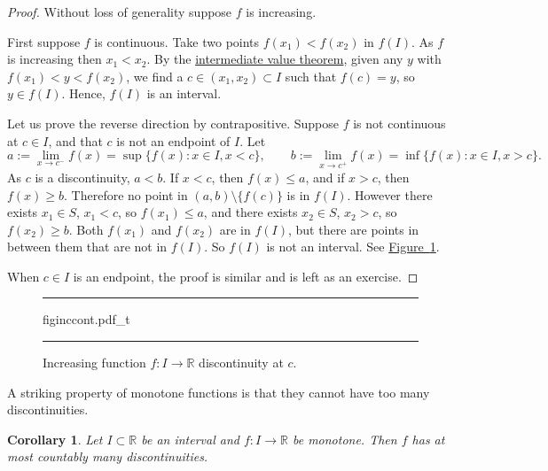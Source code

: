 \documentclass[12pt]{book}
\newenvironment{myfigureht}{%
\begin{figure}[h!t]
\noindent\rule{\textwidth}{0.4pt}\vspace{12pt}\par\centering}%
{\par\noindent\rule{\textwidth}{0.4pt}
\end{figure}}
\newcommand{\R}{{\mathbb{R}}}
\theoremstyle{plain}
\newtheorem{cor}[thm]{Corollary}
\theoremstyle{remark}
\theoremstyle{definition}
\theoremstyle{exercise}
\theoremstyle{example}
\newcommand{\figureref}[1]{\hyperref[#1]{Figure~\ref*{#1}}}
\newcommand{\corref}[1]{\hyperref[#1]{Corollary~\ref*{#1}}}
\begin{document}
\begin{proof}
Without loss of generality suppose $f$ is increasing.

First suppose $f$ is continuous.  Take two points
$f(x_1) < f(x_2)$ in $f(I)$.
As $f$ is increasing then $x_1 < x_2$.  By the
\hyperref[IVT:thm]{intermediate value theorem},
given any $y$ with $f(x_1) < y < f(x_2)$, we find
a $c \in (x_1,x_2) \subset I$ such that $f(c) = y$, so $y \in f(I)$. 
Hence, $f(I)$ is an interval.


Let us prove the reverse direction by contrapositive.
Suppose $f$ is not continuous at $c \in I$,
and that $c$ is not an endpoint of $I$.
Let
\begin{equation*}
a := \lim_{x \to c^-} f(x) = \sup \{ f(x) : x \in I, x < c \} ,
\qquad
b := \lim_{x \to c^+} f(x) = \inf \{ f(x) : x \in I, x > c \} .
\end{equation*}
As $c$ is a discontinuity, $a < b$.
If $x < c$, then $f(x) \leq a$, and
if $x > c$, then $f(x) \geq b$.  Therefore
no point
in $(a,b) \setminus \{ f(c) \}$ is in $f(I)$.
However there exists $x_1 \in S$, $x_1 < c$, so
$f(x_1) \leq a$, and there exists $x_2 \in S$, $x_2 > c$,
so $f(x_2) \geq b$.  Both $f(x_1)$ and $f(x_2)$ are in $f(I)$,
but there are points in between them that are not in $f(I)$.
So $f(I)$ is not an interval.  See \figureref{fig:figinccont}.

When $c \in I$ is an endpoint, the proof is similar and is left as an exercise.
\end{proof}

\begin{myfigureht}
{figinccont.pdf_t}
\caption{Increasing function $f \colon I \to \R$ discontinuity at
$c$.\label{fig:figinccont}}
\end{myfigureht}

A striking property of monotone functions is that they cannot have
too many discontinuities.

\begin{cor} \label{cor:monotcountcont}
Let $I \subset \R$ be an interval and
$f \colon I \to \R$ be monotone.  Then $f$ has at most
countably many discontinuities.
\end{cor}
\end{document}
